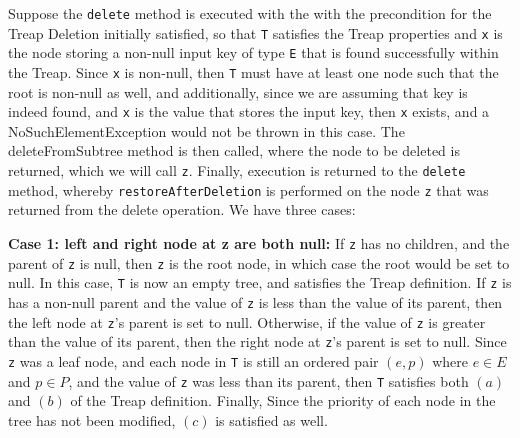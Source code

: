 \documentclass[12pt]{article}
\newenvironment{problem}[2][Problem]{\begin{trivlist}
\item[\hskip \labelsep {\bfseries #1}\hskip \labelsep {\bfseries #2.}]}{\end{trivlist}}
\begin{document}
\begin{problem}{6}

Suppose the \texttt{delete} method is executed with the with the precondition for the Treap Deletion initially satisfied, so that \texttt{T} satisfies
the Treap properties and \texttt{x} is the node storing a non-null input key of type \texttt{E} that is found successfully within the Treap. Since \texttt{x} is non-null,
then \texttt{T} must have at least one node such that the root is non-null as well, and additionally, since we are assuming that key is indeed found, and
\texttt{x} is the value that stores the input key, then \texttt{x} exists, and a NoSuchElementException would not be thrown in this case. The deleteFromSubtree method
is then called, where the node to be deleted is returned, which we will call \texttt{z}. Finally, execution is returned to the \texttt{delete} method, whereby
\texttt{restoreAfterDeletion} is performed on the node \texttt{z} that was returned from the delete operation. We have three cases: \newline

\noindent
\textbf{Case 1: left and right node at z are both null:} \newline
If \texttt{z} has no children, and the parent of \texttt{z} is null, then \texttt{z} is the root node, in which case the root would be set to null. In this case, \texttt{T} is now an empty tree, 
and satisfies the Treap definition. If \texttt{z} is has a non-null parent and the value of \texttt{z} is less than the value of its parent, then the left node at \texttt{z}'s parent is set
to null. Otherwise, if the value of \texttt{z} is greater than the value of its parent, then the right node at \texttt{z}'s parent is set to null. Since \texttt{z} was a leaf node, and
each node in \texttt{T} is still an ordered pair $(e, p)$ where $e \in E$ and $p \in P$, and the value of \texttt{z} was less than its parent, then \texttt{T} satisfies both $(a)$ and $(b)$ of the Treap
definition. Finally, Since the priority of each node in the tree has not been modified, $(c)$ is satisfied as well. \newline


\end{problem}
\end{document}
